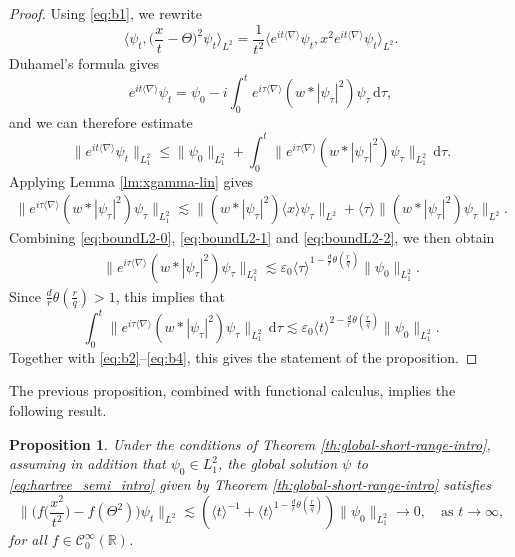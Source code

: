 \documentclass[12pt]{article}
\theoremstyle{plain}
\newtheorem{prop}[theo]{Proposition}
\begin{document}
\begin{proof}
Using \eqref{eq:b1}, we rewrite
\begin{equation}\label{eq:b2}
\Big\langle\psi_t,\Big(\frac{x}{t}-\Theta\Big)^2\psi_t\Big\rangle_{L^2}=\frac{1}{t^2}\big\langle e^{it\langle\nabla\rangle}\psi_t,x^2e^{it\langle\nabla\rangle}\psi_t\big\rangle_{L^2}.
\end{equation}
Duhamel's formula gives
\begin{equation}\label{eq:b3}
e^{it\langle\nabla\rangle}\psi_t=\psi_0-i \int_0^t e^{i\tau\langle\nabla\rangle} (w * |\psi_\tau|^2)\psi_\tau\, \mathrm{d}\tau ,
\end{equation}
and we can therefore estimate
\begin{equation}\label{eq:b4}
\big\| e^{it\langle\nabla\rangle}\psi_t\big\|_{L^2_1}\le \|\psi_0\|_{L^2_1}+ \int_0^t \big\| e^{i\tau\langle\nabla\rangle} (w * |\psi_\tau|^2)\psi_\tau\big\|_{L^2_1}\, \mathrm{d}\tau .
\end{equation}
Applying Lemma \ref{lm:xgamma-lin} gives
\begin{align*}
\big\| e^{i\tau\langle\nabla\rangle} (w * |\psi_\tau|^2)\psi_\tau\big\|_{L^2_1}\lesssim \big\|(w * |\psi_\tau|^2)\langle x\rangle\psi_\tau\big\|_{L^2}+\langle \tau\rangle\big\|(w * |\psi_\tau|^2)\psi_\tau\big\|_{L^2}.
\end{align*}
Combining \eqref{eq:boundL2-0}, \eqref{eq:boundL2-1} and \eqref{eq:boundL2-2}, we then obtain 
\begin{align*}
\big\| e^{i\tau\langle\nabla\rangle} (w * |\psi_\tau|^2)\psi_\tau\big\|_{L^2_1}\lesssim\varepsilon_0\langle\tau\rangle^{1-\frac dr\theta (\frac{r}{q})}\|\psi_0\|_{L^2_1}.
\end{align*}
Since $\frac dr\theta (\frac{r}{q})>1$, this implies that
\begin{equation*}
 \int_0^t \big\| e^{i\tau\langle\nabla\rangle} (w * |\psi_\tau|^2)\psi_\tau\big\|_{L^2_1}\, \mathrm{d}\tau \lesssim\varepsilon_0\langle t\rangle^{2-\frac dr \theta (\frac{r}{q})}\|\psi_0\|_{L^2_1}.
\end{equation*}
Together with \eqref{eq:b2}--\eqref{eq:b4}, this gives the statement of the proposition.
\end{proof}

The previous proposition, combined with functional calculus, implies the following result.

\begin{prop}\label{prop:diff-f}
Under the conditions of Theorem \ref{th:global-short-range-intro}, assuming in addition that $\psi_0\in L_1^2$,  
the global solution $\psi$ to \eqref{eq:hartree_semi_intro} given by Theorem \ref{th:global-short-range-intro} satisfies
\begin{equation*}
\Big\|\Big(f\Big(\frac{x^2}{t^2}\Big)-f(\Theta^2)\Big)\psi_t\Big\|_{L^2}\lesssim (\langle t \rangle^{-1} + \langle  t\rangle^{1-\frac dr \theta (\frac{r}{q})}) \|\psi_0\|_{L^2_1} \to 0 , \quad \text{as } t\to\infty,
\end{equation*}
for all $f\in \mathcal{C}_0^\infty(\mathbb{R})$.
\end{prop}
\end{document}
